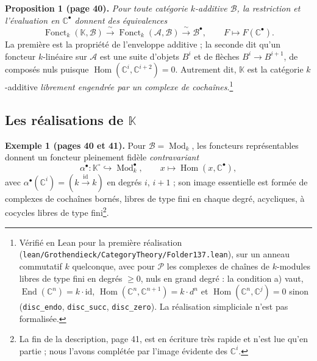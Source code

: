 \documentclass[11pt,a4paper]{article}
\begin{document}
\textbf{Proposition 1 (page 40).} \emph{Pour toute catégorie $k$-additive
$\mathcal{B}$, la restriction et l'évaluation en $\mathbb{C}^{\bullet}$
donnent des équivalences
\[
  \operatorname{Fonct}_{k}(\mathbb{K}, \mathcal{B}) \xrightarrow{\ \sim\ }
  \operatorname{Fonct}_{k}(\mathcal{A}, \mathcal{B}) \xrightarrow{\ \sim\ }
  \mathcal{B}^{\bullet}, \qquad F \mapsto F(\mathbb{C}^{\bullet}).
\]}
La première est la propriété de l'enveloppe additive ; la seconde dit qu'un
foncteur $k$-linéaire sur $\mathcal{A}$ est une suite d'objets $B^{i}$ et de
flèches $B^{i} \to B^{i+1}$, de composés nuls puisque
$\operatorname{Hom}(\mathbb{C}^{i}, \mathbb{C}^{i+2}) = 0$. Autrement dit,
$\mathbb{K}$ est la catégorie $k$-additive \emph{librement engendrée par un
complexe de cochaînes}.\footnote{Vérifié en Lean pour la première réalisation
(\texttt{lean/Grothendieck/CategoryTheory/Folder137.lean}), sur un anneau commutatif $k$
quelconque, avec pour $\mathcal{P}$ les complexes de chaînes de $k$-modules
libres de type fini en degrés $\geqslant 0$, nuls en grand degré : la condition
a) vaut, $\operatorname{End}(\mathbb{C}^{n}) = k \cdot \mathrm{id}$,
$\operatorname{Hom}(\mathbb{C}^{n}, \mathbb{C}^{n+1}) = k \cdot d^{n}$ et
$\operatorname{Hom}(\mathbb{C}^{n}, \mathbb{C}^{j}) = 0$ sinon
(\texttt{disc\_endo}, \texttt{disc\_succ}, \texttt{disc\_zero}). La réalisation
simpliciale n'est pas formalisée.}

\subsection*{Les réalisations de $\mathbb{K}$}

\textbf{Exemple 1 (pages 40 et 41).} Pour $\mathcal{B} = \operatorname{Mod}_{k}$,
les foncteurs représentables donnent un foncteur pleinement fidèle
\emph{contravariant}
\[
  \alpha^{\bullet} : \mathbb{K}^{\circ} \hookrightarrow
  \operatorname{Mod}_{k}^{\bullet}, \qquad x \mapsto
  \operatorname{Hom}(x, \mathbb{C}^{\bullet}),
\]
avec $\alpha^{\bullet}(\mathbb{C}^{i}) = (k \xrightarrow{\mathrm{id}} k)$ en
degrés $i$, $i+1$ ; son image essentielle est formée de complexes de
cochaînes bornés, libres de type fini en chaque degré, acycliques, à
cocycles libres de type fini\footnote{La fin de la description, page 41, est
en écriture très rapide et n'est lue qu'en partie ; nous l'avons complétée
par l'image évidente des $\mathbb{C}^{i}$.}.
\end{document}
